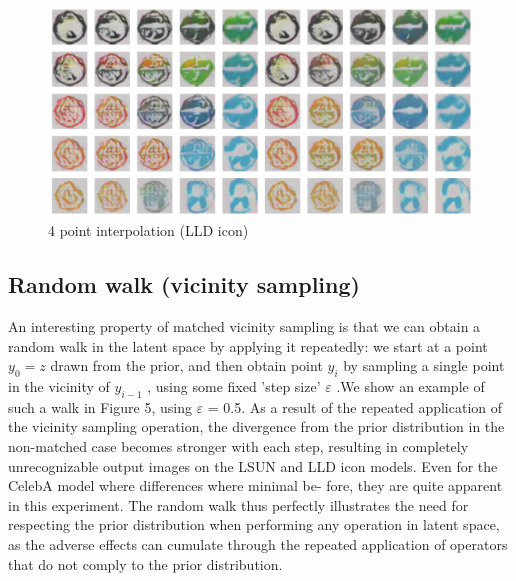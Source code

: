 \documentclass{article}
\begin{document}
\begin{center}
\begin{figure}
    \includegraphics[width=\linewidth]{CelebA/images/LLD_int4_1.png}
    \caption{4 point interpolation (LLD icon)}
\end{figure}
\end{center}


\subsection{Random walk (vicinity sampling)}
An interesting property of matched vicinity sampling is that we can obtain a
random walk in the latent space by applying it repeatedly: we start at a point $y_0 = z$ drawn from the prior, and then obtain point $y_i$ by sampling a single point in the vicinity of $y_{i-1}$ , using some fixed ’step size’ $\varepsilon$ .We show an example of such a walk in Figure 5, using $\varepsilon$ = 0.5. As a result of the repeated application of the vicinity sampling operation, the divergence from the prior distribution in the non-matched
case becomes stronger with each step, resulting in completely unrecognizable output images on the LSUN and LLD icon models. Even for the CelebA model where differences where minimal be-
fore, they are quite apparent in this experiment. The random walk thus perfectly illustrates the need for respecting the prior distribution when performing any operation in latent space, as the adverse effects can cumulate through the repeated application of operators that do not comply to the prior distribution.
\end{document}
